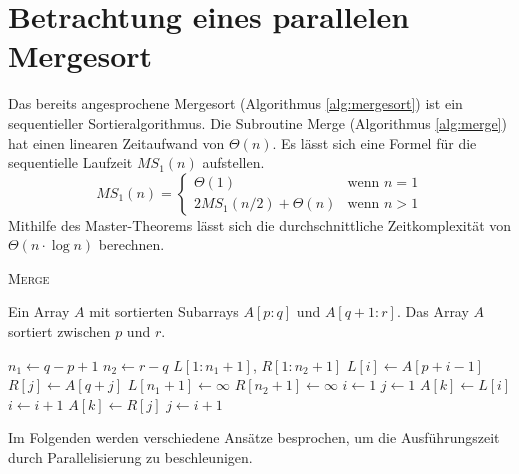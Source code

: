 \section{Betrachtung eines parallelen Mergesort}
Das bereits angesprochene Mergesort (Algorithmus \ref{alg:mergesort}) ist ein
sequentieller Sortieralgorithmus.
Die Subroutine Merge (Algorithmus \ref{alg:merge}) hat einen linearen
Zeitaufwand von $\Theta(n)$.
Es lässt sich eine Formel für die sequentielle Laufzeit $MS_1(n)$ aufstellen.
\begin{equation}
    MS_1(n) = \begin{cases}
        \Theta(1) & \text{wenn } n = 1 \\
        2MS_1(n/2) + \Theta(n) & \text{wenn } n > 1
    \end{cases}
\end{equation}
Mithilfe des Master-Theorems lässt sich die durchschnittliche Zeitkomplexität
von $\Theta(n \cdot \log n)$ berechnen.
%
\begin{algorithm}
    \caption{{\rmfamily \textsc{Merge}} \cite[S.31]{cormen}}
    \label{alg:merge}
    \begin{algorithmic}[1]
        \Require Ein Array $A$ mit sortierten Subarrays $A[p:q]$ und
            $A[q+1:r]$.
        \Ensure Das Array $A$ sortiert zwischen $p$ und $r$.
        \setlength\multicolsep{0pt}
        \begin{multicols}{2}
            \State $n_1 \gets q - p + 1$
            \State $n_2 \gets r - q$
            \State $L[1:n_1 +1]$, $R[1:n_2 + 1]$
                \State $L[i] \gets A[p + i - 1]$
            \EndFor
                \State $R[j] \gets A[q + j]$
            \EndFor
            \State $L[n_1 + 1] \gets \infty$
            \State $R[n_2 + 1] \gets \infty$
            \State $i \gets 1$
            \State $j \gets 1$
                    \State $A[k] \gets L[i]$
                    \State $i \gets i + 1$
                \Else
                    \State $A[k] \gets R[j]$
                    \State $j \gets i + 1$
                \EndIf
            \EndFor
        \end{multicols}
    \end{algorithmic}
\end{algorithm}

Im Folgenden werden verschiedene Ansätze besprochen, um die Ausführungszeit
durch Parallelisierung zu beschleunigen.
